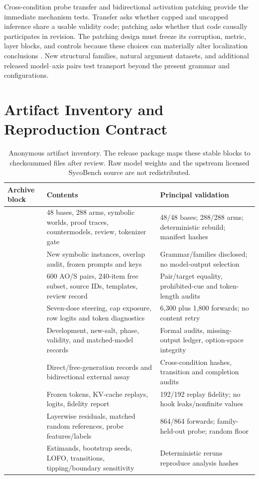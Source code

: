 \documentclass[letterpaper]{article}
\begin{document}
Cross-condition probe transfer and bidirectional activation patching provide the immediate mechanism tests.  Transfer asks whether capped and uncapped inference share a usable validity code; patching asks whether that code causally participates in revision.   The patching design must freeze its corruption, metric, layer blocks, and controls because these choices can materially alter localization conclusions \citep{zhang2023patching}.  New structural families, natural argument datasets, and additional released model--axis pairs test transport beyond the present grammar and configurations.

\section{Artifact Inventory and Reproduction Contract}
\label{supp:reproducibility}

\begin{table}[t]
\centering
\small
\renewcommand{\arraystretch}{1.12}
\begin{tabularx}{\textwidth}{@{}L{3.2cm}YY@{}}
\toprule
Archive block & Contents & Principal validation \\
\midrule
{} & 48 bases, 288 arms, symbolic worlds, proof traces, countermodels, review, tokenizer gate & 48/48 bases; 288/288 arms; deterministic rebuild; manifest hashes \\
 & New symbolic instances, overlap audit, frozen prompts and keys & Grammar/families disclosed; no model-output selection \\
 & 600 AO/S pairs, 240-item free subset, source IDs, templates, review record & Pair/target equality, prohibited-cue and token-length audits \\
 & Seven-dose steering, cap exposure, row logits and token diagnostics & 6,300 plus 1,800 forwards; no content retry \\
 & Development, new-salt, phase, validity, and matched-model records & Formal audits, missing-output ledger, option-space integrity \\
 & Direct/free-generation records and bidirectional external assay & Cross-condition hashes, transition and completion audits \\
 & Frozen tokens, KV-cache replays, logits, fidelity report & 192/192 replay fidelity; no hook leaks/nonfinite values \\
 & Layerwise residuals, matched random references, probe features/labels & 864/864 forwards; family-held-out probe; random floor \\
 & Estimands, bootstrap seeds, LOFO, transitions, tipping/boundary sensitivity & Deterministic reruns reproduce analysis hashes \\
\bottomrule
\end{tabularx}
\caption{Anonymous artifact inventory. The release package maps these stable blocks to checksummed files after review.  Raw model weights and the upstream licensed SycoBench source are not redistributed.}
\label{tab:supp-artifacts}
\end{table}
\end{document}
